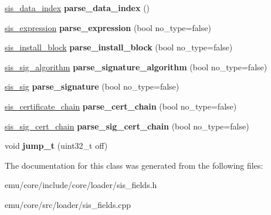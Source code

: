 \begin{DoxyCompactItemize}
\mbox{\hyperlink{structeka2l1_1_1loader_1_1sis__data__index}{sis\+\_\+data\+\_\+index}} {\bfseries parse\+\_\+data\+\_\+index} ()
\item 
\mbox{\label{classeka2l1_1_1loader_1_1sis__parser_a0f0a6e0d4ff192221a775fd30569fa8a}} 
\mbox{\hyperlink{structeka2l1_1_1loader_1_1sis__expression}{sis\+\_\+expression}} {\bfseries parse\+\_\+expression} (bool no\+\_\+type=false)
\item 
\mbox{\label{classeka2l1_1_1loader_1_1sis__parser_a5c23899ddd900f1d5ac8e253b340fc1a}} 
\mbox{\hyperlink{structeka2l1_1_1loader_1_1sis__install__block}{sis\+\_\+install\+\_\+block}} {\bfseries parse\+\_\+install\+\_\+block} (bool no\+\_\+type=false)
\item 
\mbox{\label{classeka2l1_1_1loader_1_1sis__parser_aca79c3af02b57238f0e052b35f5b0b59}} 
\mbox{\hyperlink{structeka2l1_1_1loader_1_1sis__sig__algorithm}{sis\+\_\+sig\+\_\+algorithm}} {\bfseries parse\+\_\+signature\+\_\+algorithm} (bool no\+\_\+type=false)
\item 
\mbox{\label{classeka2l1_1_1loader_1_1sis__parser_a0fa89e295bbc21621376f89547517040}} 
\mbox{\hyperlink{structeka2l1_1_1loader_1_1sis__sig}{sis\+\_\+sig}} {\bfseries parse\+\_\+signature} (bool no\+\_\+type=false)
\item 
\mbox{\label{classeka2l1_1_1loader_1_1sis__parser_ad74dbc5c349527a63c3cfe7f478cd13e}} 
\mbox{\hyperlink{structeka2l1_1_1loader_1_1sis__certificate__chain}{sis\+\_\+certificate\+\_\+chain}} {\bfseries parse\+\_\+cert\+\_\+chain} (bool no\+\_\+type=false)
\item 
\mbox{\label{classeka2l1_1_1loader_1_1sis__parser_a88e6ec9ee7ddf4933594280994f4aa01}} 
\mbox{\hyperlink{structeka2l1_1_1loader_1_1sis__sig__cert__chain}{sis\+\_\+sig\+\_\+cert\+\_\+chain}} {\bfseries parse\+\_\+sig\+\_\+cert\+\_\+chain} (bool no\+\_\+type=false)
\item 
\mbox{\label{classeka2l1_1_1loader_1_1sis__parser_a6ba20e146f708c8cea90e3153ddccd95}} 
void {\bfseries jump\+\_\+t} (uint32\+\_\+t off)
\end{DoxyCompactItemize}


The documentation for this class was generated from the following files\+:\begin{DoxyCompactItemize}
\item 
emu/core/include/core/loader/sis\+\_\+fields.\+h\item 
emu/core/src/loader/sis\+\_\+fields.\+cpp\end{DoxyCompactItemize}
